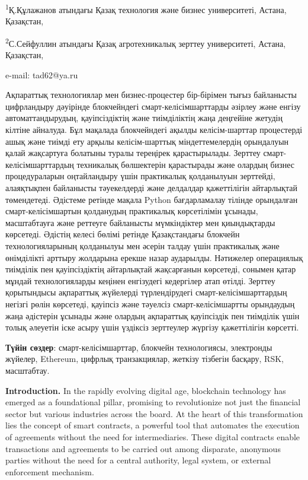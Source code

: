 \textsuperscript{1}Қ.Құлажанов атындағы Қазақ технология және бизнес
университеті, Астана, Қазақстан,

\textsuperscript{2}С.Сейфуллин атындағы Қазақ агротехникалық зерттеу
университеті, Астана, Қазақстан,

e-mail: tad62@ya.ru

Ақпараттық технологиялар мен бизнес-процестер бір-бірімен тығыз
байланысты цифрландыру дәуірінде блокчейндегі смарт-келісімшарттарды
әзірлеу және енгізу автоматтандырудың, қауіпсіздіктің және тиімділіктің
жаңа деңгейіне жетудің кілтіне айналуда. Бұл мақалада блокчейндегі
ақылды келісім-шарттар процестерді ашық және тиімді ету арқылы
келісім-шарттық міндеттемелердің орындалуын қалай жақсартуға болатыны
туралы тереңірек қарастырылады. Зерттеу смарт-келісімшарттардың
техникалық бөлшектерін қарастырады және олардың бизнес процедураларын
оңтайландыру үшін практикалық қолданылуын зерттейді, алаяқтықпен
байланысты тәуекелдерді және делдалдар қажеттілігін айтарлықтай
төмендетеді. Әдістеме ретінде мақала Python бағдарламалау тілінде
орындалған смарт-келісімшартын қолданудың практикалық көрсетілімін
ұсынады, масштабтауға және реттеуге байланысты мүмкіндіктер мен
қиындықтарды көрсетеді. Әдістің келесі бөлімі ретінде Қазақстандағы
блокчейн технологияларының қолданылуы мен әсерін талдау үшін практикалық
және өнімділікті арттыру жолдарына ерекше назар аударылды. Нәтижелер
операциялық тиімділік пен қауіпсіздіктің айтарлықтай жақсарғанын
көрсетеді, сонымен қатар мұндай технологияларды кеңінен енгізудегі
кедергілер атап өтілді. Зерттеу қорытындысы ақпараттық жүйелерді
түрлендірудегі смарт-келісімшарттардың негізгі рөлін көрсетеді, қауіпсіз
және тәуелсіз смарт-келісімшартты орындаудың жаңа әдістерін ұсынады және
олардың ақпараттық қауіпсіздік пен тиімділік үшін толық әлеуетін іске
асыру үшін үздіксіз зерттеулер жүргізу қажеттілігін көрсетті.

{\bfseries Түйін сөздер}: смарт-келісімшарттар, блокчейн технологиясы,
электронды жүйелер, Ethereum, цифрлық транзакциялар, жеткізу тізбегін
басқару, RSK, масштабтау.

{\bfseries Introduction.} In the rapidly evolving digital age, blockchain
technology has emerged as a foundational pillar, promising to
revolutionize not just the financial sector but various industries
across the board. At the heart of this transformation lies the concept
of smart contracts, a powerful tool that automates the execution of
agreements without the need for intermediaries. These digital contracts
enable transactions and agreements to be carried out among disparate,
anonymous parties without the need for a central authority, legal
system, or external enforcement mechanism.


